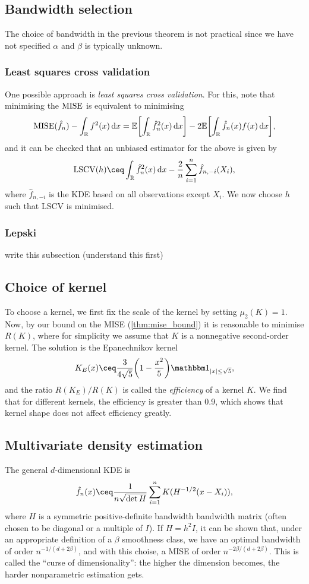 \subsection{Bandwidth selection}
The choice of bandwidth in the previous theorem is not practical since we have not specified $\alpha$ and $\beta$ is typically unknown. 

\subsubsection{Least squares cross validation}
One possible approach is \emph{least squares cross validation}. For this, note that minimising the $\operatorname{MISE}$ is equivalent to minimising
\[
\operatorname{MISE}(\hat f_n) - \int_\mathbb R f^2(x) \dd{x} = \mathbb E\qty[ \int_\mathbb R \hat f_n^2(x) \dd{x}] - 2\mathbb E\qty[ \int_\mathbb R \hat f_n(x) f(x) \dd{x}],
\]
and it can be checked that an unbiased estimator for the above is given by 
\[
\Rm{LSCV}(h) \ceq \int_\RR \hat f_n^2(x) \dd{x} - \frac2n \sum_{i=1}^n \hat f_{n, -i}(X_i),
\]
where $\hat f_{n, -i}$ is the KDE based on all observations except $X_i$. We now choose $h$ such that LSCV is minimised. 

\subsubsection{Lepski}
\TODO write this subsection (\TODO understand this first)

\subsection{Choice of kernel}
To choose a kernel, we first fix the scale of the kernel by setting $\mu_2(K) = 1$. Now, by our bound on the MISE (\cref{thm:mise_bound}) it is reasonable to minimise $R(K)$, where for simplicity we assume that $K$ is a nonnegative second-order kernel. The solution is the Epanechnikov kernel
\[
K_E(x) \ceq \frac{3}{4\sqrt 5} \qty(1 - \frac{x^2}{5}) \ind_{\abs{x} \leq \sqrt 5}, 
\]
and the ratio $R(K_E)/R(K)$ is called the \emph{efficiency} of a kernel $K$. We find that for different kernels, the efficiency is greater than 0.9, which shows that kernel shape does not affect efficiency greatly. 


\subsection{Multivariate density estimation}
The general $d$-dimensional KDE is 
\[
\hat f_n(x) \ceq \frac{1}{n \sqrt{\det H}} \sum_{i=1}^n K(H^{-1/2}(x - X_i)),
\]
where $H$ is a symmetric positive-definite bandwidth bandwidth matrix (often chosen to be diagonal or a multiple of $I$). If $H = h^2 I$, it can be shown that, under an appropriate definition of a $\beta$ smoothness class, we have an optimal bandwidth of order $n^{-1/(d + 2\beta)}$, and with this choise, a MISE of order $n^{-2\beta/(d + 2\beta)}$. This is called the ``curse of dimensionality'': the higher the dimension becomes, the harder nonparametric estimation gets. 

